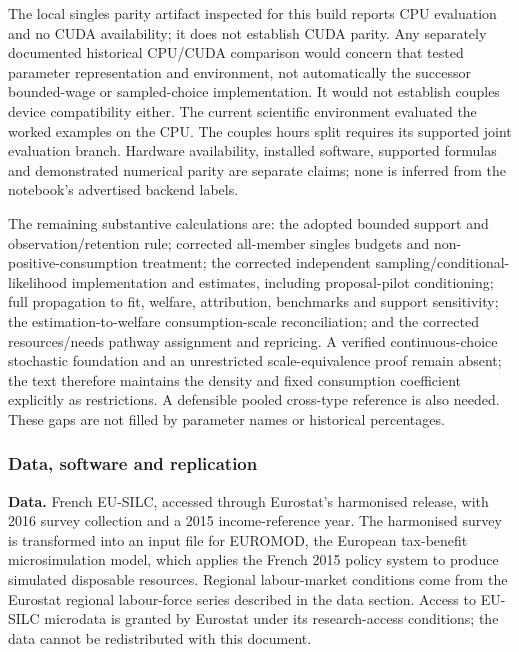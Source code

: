 \documentclass[11pt,a4paper]{article}
\begin{document}
The local singles parity artifact inspected for this build reports CPU evaluation and no CUDA availability; it does not establish CUDA parity. Any separately documented historical CPU/CUDA comparison would concern that tested parameter representation and environment, not automatically the successor bounded-wage or sampled-choice implementation. It would not establish couples device compatibility either. The current scientific environment evaluated the worked examples on the CPU. The couples hours split requires its supported joint evaluation branch. Hardware availability, installed software, supported formulas and demonstrated numerical parity are separate claims; none is inferred from the notebook's advertised backend labels.

The remaining substantive calculations are: the adopted bounded support and observation/retention rule; corrected all-member singles budgets and non-positive-consumption treatment; the corrected independent sampling/conditional-likelihood implementation and estimates, including proposal-pilot conditioning; full propagation to fit, welfare, attribution, benchmarks and support sensitivity; the estimation-to-welfare consumption-scale reconciliation; and the corrected resources/needs pathway assignment and repricing. A verified continuous-choice stochastic foundation and an unrestricted scale-equivalence proof remain absent; the text therefore maintains the density and fixed consumption coefficient explicitly as restrictions. A defensible pooled cross-type reference is also needed. These gaps are not filled by parameter names or historical percentages.

\subsubsection{Data, software and replication}\label{data-software-and-replication-1}

\textbf{Data.} French EU-SILC, accessed through Eurostat's harmonised release, with 2016 survey collection and a 2015 income-reference year. The harmonised survey is transformed into an input file for EUROMOD, the European tax-benefit microsimulation model, which applies the French 2015 policy system to produce simulated disposable resources. Regional labour-market conditions come from the Eurostat regional labour-force series described in the data section. Access to EU-SILC microdata is granted by Eurostat under its research-access conditions; the data cannot be redistributed with this document.
\end{document}
